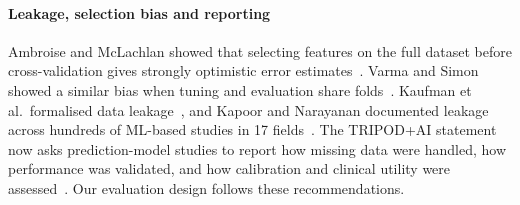 \paragraph{Leakage, selection bias and reporting}
Ambroise and McLachlan showed that selecting features on the full dataset before cross-validation gives strongly optimistic error estimates~\cite{ambroise2002selection}. Varma and Simon showed a similar bias when tuning and evaluation share folds~\cite{varma2006bias}. Kaufman et al.\ formalised data leakage~\cite{kaufman2012leakage}, and Kapoor and Narayanan documented leakage across hundreds of ML-based studies in 17 fields~\cite{kapoor2023leakage}. The TRIPOD+AI statement now asks prediction-model studies to report how missing data were handled, how performance was validated, and how calibration and clinical utility were assessed~\cite{collins2024tripodai}. Our evaluation design follows these recommendations.
